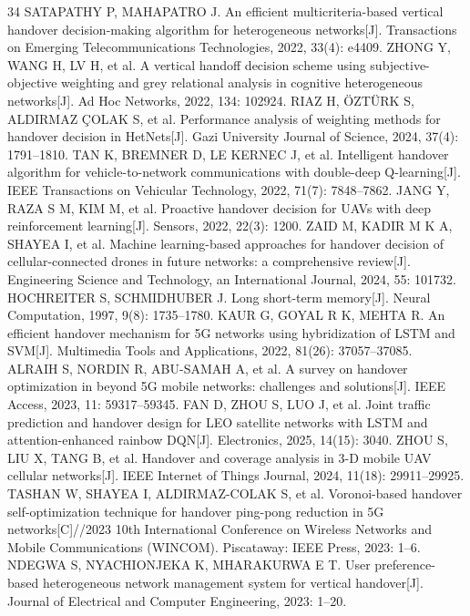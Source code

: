 \documentclass[10pt,a4paper]{article}
\begin{document}
{\begin{thebibliography}{34}
 SATAPATHY P, MAHAPATRO J. An efficient multicriteria-based vertical handover decision-making algorithm for heterogeneous networks[J]. Transactions on Emerging Telecommunications Technologies, 2022, 33(4): e4409.
 ZHONG Y, WANG H, LV H, et al. A vertical handoff decision scheme using subjective-objective weighting and grey relational analysis in cognitive heterogeneous networks[J]. Ad Hoc Networks, 2022, 134: 102924.
 RIAZ H, \"OZT\"URK S, ALDIRMAZ \c{C}OLAK S, et al. Performance analysis of weighting methods for handover decision in HetNets[J]. Gazi University Journal of Science, 2024, 37(4): 1791--1810.
 TAN K, BREMNER D, LE KERNEC J, et al. Intelligent handover algorithm for vehicle-to-network communications with double-deep Q-learning[J]. IEEE Transactions on Vehicular Technology, 2022, 71(7): 7848--7862.
 JANG Y, RAZA S M, KIM M, et al. Proactive handover decision for UAVs with deep reinforcement learning[J]. Sensors, 2022, 22(3): 1200.
 ZAID M, KADIR M K A, SHAYEA I, et al. Machine learning-based approaches for handover decision of cellular-connected drones in future networks: a comprehensive review[J]. Engineering Science and Technology, an International Journal, 2024, 55: 101732.
 HOCHREITER S, SCHMIDHUBER J. Long short-term memory[J]. Neural Computation, 1997, 9(8): 1735--1780.
 KAUR G, GOYAL R K, MEHTA R. An efficient handover mechanism for 5G networks using hybridization of LSTM and SVM[J]. Multimedia Tools and Applications, 2022, 81(26): 37057--37085.
 ALRAIH S, NORDIN R, ABU-SAMAH A, et al. A survey on handover optimization in beyond 5G mobile networks: challenges and solutions[J]. IEEE Access, 2023, 11: 59317--59345.
 FAN D, ZHOU S, LUO J, et al. Joint traffic prediction and handover design for LEO satellite networks with LSTM and attention-enhanced rainbow DQN[J]. Electronics, 2025, 14(15): 3040.
 ZHOU S, LIU X, TANG B, et al. Handover and coverage analysis in 3-D mobile UAV cellular networks[J]. IEEE Internet of Things Journal, 2024, 11(18): 29911--29925.
 TASHAN W, SHAYEA I, ALDIRMAZ-COLAK S, et al. Voronoi-based handover self-optimization technique for handover ping-pong reduction in 5G networks[C]//2023 10th International Conference on Wireless Networks and Mobile Communications (WINCOM). Piscataway: IEEE Press, 2023: 1--6.
 NDEGWA S, NYACHIONJEKA K, MHARAKURWA E T. User preference-based heterogeneous network management system for vertical handover[J]. Journal of Electrical and Computer Engineering, 2023: 1--20.

\end{thebibliography}}
\end{document}
